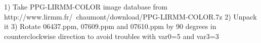 
1) Take PPG-LIRMM-COLOR image database from http://www.lirmm.fr/~chaumont/download/PPG-LIRMM-COLOR.7z
2) Unpack it
3) Rotate 06437.ppm, 07609.ppm and 07610.ppm by 90 degrees in counterclockwise direction to avoid troubles with var0=5 and var3=3
